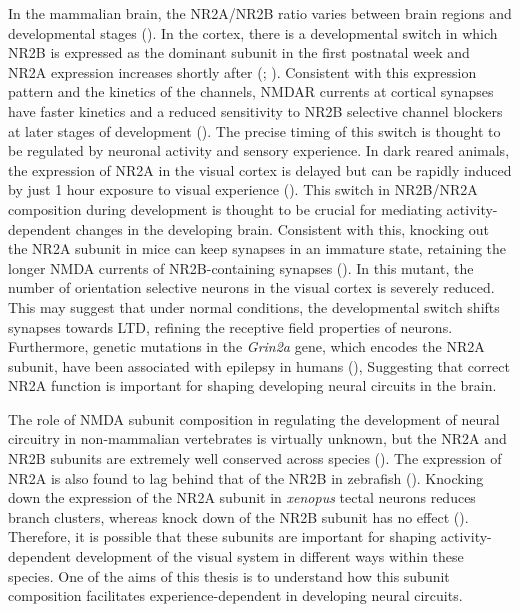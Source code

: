 In the mammalian brain, the NR2A/NR2B ratio varies between brain regions and developmental stages (\cite{Cull-Candy2001NMDADisease}).  In the cortex, there is a developmental switch in which NR2B is expressed as the dominant subunit in the first postnatal week and NR2A expression increases shortly after (\cite{Monyer1994DevelopmentalReceptors};  \cite{Sans2000ASynapses, Sheng1994ChangingCortex}). Consistent with this expression pattern and the kinetics of the channels, NMDAR currents at cortical synapses have faster kinetics and a reduced sensitivity to NR2B selective channel blockers at later stages of development (\cite{Carmignoto1992Activity-dependentCortex, Flint1997, Tovar1999TheVitro}). The precise timing of this switch is thought to be regulated by neuronal activity and sensory experience. In dark reared animals, the expression of NR2A in the visual cortex is delayed but can be rapidly induced by just 1 hour exposure to visual experience (\cite{Quinlan1999BidirectionalDevelopment, Carmignoto1992Activity-dependentCortex,Quinlan1999RapidVivo,Philpot2001VisualCortex}).
This switch in NR2B/NR2A composition during development is thought to be crucial for mediating activity-dependent changes in the developing brain. Consistent with this, knocking out the NR2A subunit in mice can keep synapses in an immature state, retaining the longer NMDA currents of NR2B-containing synapses (\cite{Fagiolini2003SeparableSignaling}). In this mutant, the number of orientation selective neurons in the visual cortex is severely reduced. This may suggest that under normal conditions, the developmental switch shifts synapses towards LTD, refining the receptive field properties of neurons. Furthermore, genetic mutations in the \textit{Grin2a} gene, which encodes the NR2A subunit, have been associated with epilepsy in humans (\cite{Gao2017AAphasia}), Suggesting that correct NR2A function is important for shaping developing neural circuits in the brain.

The role of NMDA subunit composition in regulating the development of neural circuitry in non-mammalian vertebrates is virtually unknown, but the NR2A and NR2B subunits are extremely well conserved across species (\cite{Ewald2009CloningTadpoles}). The expression of NR2A is also found to lag behind that of the NR2B in zebrafish (\cite{White2017AZebrafish}). Knocking down the expression of the NR2A subunit in \textit{xenopus} tectal neurons reduces branch clusters, whereas knock down of the NR2B subunit has no effect (\cite{Ewald2008RolesVivo}). Therefore, it is possible that these subunits are important for shaping activity-dependent development of the visual system in different ways within these species. One of the aims of this thesis is to understand how this subunit composition facilitates experience-dependent in developing neural circuits.


